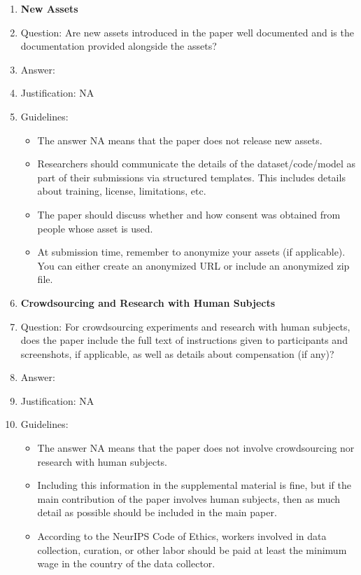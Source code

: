 \documentclass{article}
\begin{document}
\begin{enumerate}
\item {\bf New Assets}
    \item[] Question: Are new assets introduced in the paper well documented and is the documentation provided alongside the assets?
    \item[] Answer: \answerNA{} %
    \item[] Justification: NA
    \item[] Guidelines:
    \begin{itemize}
        \item The answer NA means that the paper does not release new assets.
        \item Researchers should communicate the details of the dataset/code/model as part of their submissions via structured templates. This includes details about training, license, limitations, etc. 
        \item The paper should discuss whether and how consent was obtained from people whose asset is used.
        \item At submission time, remember to anonymize your assets (if applicable). You can either create an anonymized URL or include an anonymized zip file.
    \end{itemize}

\item {\bf Crowdsourcing and Research with Human Subjects}
    \item[] Question: For crowdsourcing experiments and research with human subjects, does the paper include the full text of instructions given to participants and screenshots, if applicable, as well as details about compensation (if any)? 
    \item[] Answer: \answerNA{} %
    \item[] Justification: NA
    \item[] Guidelines:
    \begin{itemize}
        \item The answer NA means that the paper does not involve crowdsourcing nor research with human subjects.
        \item Including this information in the supplemental material is fine, but if the main contribution of the paper involves human subjects, then as much detail as possible should be included in the main paper. 
        \item According to the NeurIPS Code of Ethics, workers involved in data collection, curation, or other labor should be paid at least the minimum wage in the country of the data collector. 
    \end{itemize}


\end{enumerate}
\end{document}

